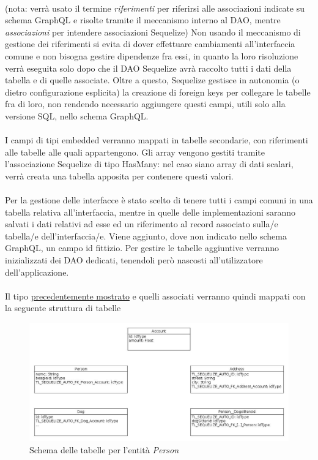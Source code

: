 \documentclass[a4paper, 12pt]{report}
\begin{document}
      \paragraph*{}
      (nota: verrà usato il termine \emph{riferimenti} per riferirsi alle associazioni indicate su schema GraphQL e risolte tramite il meccanismo interno al DAO, mentre \emph{associazioni} per intendere associazioni Sequelize)
      Non usando il meccanismo di gestione dei riferimenti si evita di dover effettuare cambiamenti all'interfaccia comune e non bisogna gestire dipendenze fra essi, in quanto la loro risoluzione verrà eseguita solo dopo che il DAO Sequelize avrà raccolto tutti i dati della tabella e di quelle associate.
      Oltre a questo, Sequelize gestisce in autonomia (o dietro configurazione esplicita) la creazione di foreign keys per collegare le tabelle fra di loro, non rendendo necessario aggiungere questi campi, utili solo alla versione SQL, nello schema GraphQL.
      \paragraph*{}
      I campi di tipi embedded verranno mappati in tabelle secondarie, con riferimenti alle tabelle alle quali appartengono.
      Gli array vengono gestiti tramite l'associazione Sequelize di tipo HasMany: nel caso siano array di dati scalari, verrà creata una tabella apposita per contenere questi valori.
      \paragraph*{}
      Per la gestione delle interfacce è stato scelto di tenere tutti i campi comuni in una tabella relativa all'interfaccia, mentre in quelle delle implementazioni saranno salvati i dati relativi ad esse ed un riferimento al record associato sulla/e tabella/e dell'interfaccia/e.
      Viene aggiunto, dove non indicato nello schema GraphQL, un campo id fittizio.
      Per gestire le tabelle aggiuntive verranno inizializzati dei DAO dedicati, tenendoli però nascosti all'utilizzatore dell'applicazione.
      \paragraph*{}
      Il tipo \hyperlink{tipo-difficile}{precedentemente mostrato} e quelli associati verranno quindi mappati con la seguente struttura di tabelle
      \begin{figure}[H]
        \includegraphics[width=\textwidth]{db-example.jpg}
        \caption{Schema delle tabelle per l'entità \emph{Person}}
      \end{figure}
\end{document}
